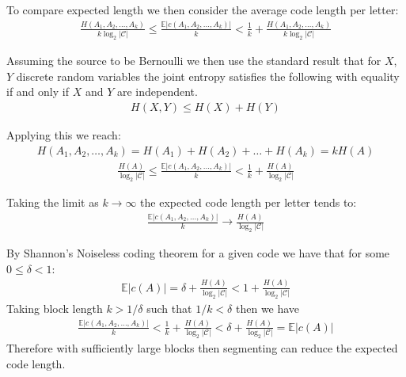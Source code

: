 \documentclass[a4paper]{article}
\begin{document}
To compare expected length we then consider the average code length per letter:
\begin{align*}
    \frac{H(A_1, A_2, \hdots, A_k)}{k \log_2 |\mathcal{C}|} \leq \frac{\mathbb{E}|c(A_1, A_2, \hdots, A_k)|}{k} < \frac{1}{k} + \frac{H(A_1, A_2, \hdots, A_k)}{k \log_2 |\mathcal{C}|}
\end{align*}

Assuming the source to be Bernoulli we then use the standard result that for $X$, $Y$ discrete random variables the joint entropy satisfies the following with equality if and only if $X$ and $Y$ are independent.
\begin{align*}
    H(X,Y) \leq H(X) + H(Y)
\end{align*}

Applying this we reach:
\begin{align*}
    H(A_1, A_2, \hdots, A_k) = H(A_1) + H(A_2) + \hdots + H(A_k) = kH(A)
\end{align*}
\begin{align*}
    \frac{H(A)}{\log_2 |\mathcal{C}|} \leq \frac{\mathbb{E}|c(A_1, A_2, \hdots, A_k)|}{k} < \frac{1}{k} + \frac{H(A)}{\log_2 |\mathcal{C}|}
\end{align*}

Taking the limit as $k \rightarrow \infty$ the expected code length per letter tends to:
\begin{align*}
    \frac{\mathbb{E}|c(A_1, A_2, \hdots, A_k)|}{k} \rightarrow \frac{H(A)}{\log_2 |\mathcal{C}|}
\end{align*}



By Shannon's Noiseless coding theorem for a given code we have that for some $0\leq \delta < 1$:
\begin{align*}
    \mathbb{E}|c(A)| = \delta + \frac{H(A)}{\log_2 |\mathcal{C}|} < 1 + \frac{H(A)}{\log_2 |\mathcal{C}|}
\end{align*}
Taking block length $k > 1/\delta$ such that $1/k < \delta$ then we have
\begin{align*}
    \frac{\mathbb{E}|c(A_1, A_2, \hdots, A_k)|}{k} < \frac{1}{k} + \frac{H(A)}{\log_2 |\mathcal{C}|} < \delta + \frac{H(A)}{\log_2 |\mathcal{C}|} = \mathbb{E}|c(A)|
\end{align*}
Therefore with sufficiently large blocks then segmenting can reduce the expected code length.
\end{document}
